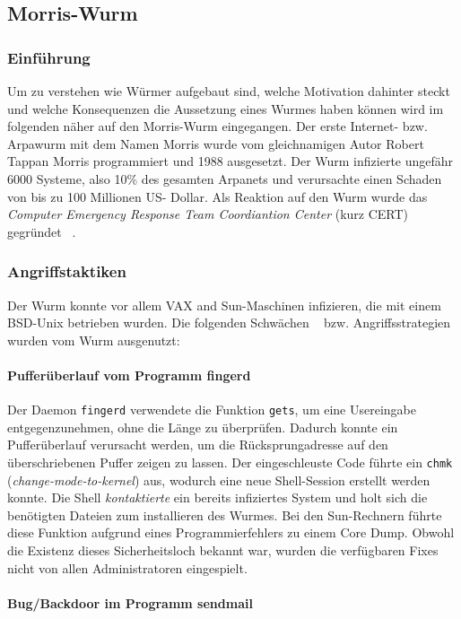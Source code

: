 \subsection {Morris-Wurm}
\subsubsection {Einführung} Um zu verstehen wie Würmer aufgebaut sind,
welche Motivation dahinter steckt und welche Konsequenzen die
Aussetzung eines Wurmes haben können wird im folgenden näher auf den
Morris-Wurm eingegangen.  Der erste Internet- bzw. Arpawurm mit dem
Namen Morris wurde vom gleichnamigen Autor Robert Tappan Morris
programmiert und 1988 ausgesetzt. Der Wurm infizierte ungefähr 6000
Systeme, also 10\% des gesamten Arpanets und verursachte einen Schaden
von bis zu 100 Millionen US- Dollar. Als Reaktion auf den Wurm wurde
das \textit{Computer Emergency Response Team Coordiantion Center}
(kurz CERT) gegründet ~\cite{wuermer-overview}.

\subsubsection {Angriffstaktiken}

Der Wurm konnte vor allem VAX and Sun-Maschinen infizieren, die mit
einem BSD-Unix betrieben wurden.  Die folgenden Schwächen
~\cite{wuermer-morris} bzw. Angriffsstrategien wurden vom Wurm
ausgenutzt:

\paragraph{Pufferüberlauf vom Programm fingerd}

Der Daemon \texttt{fingerd} verwendete die Funktion \texttt{gets}, um
eine Usereingabe entgegenzunehmen, ohne die Länge zu
überprüfen. Dadurch konnte ein Pufferüberlauf verursacht werden, um
die Rücksprungadresse auf den überschriebenen Puffer zeigen zu
lassen. Der eingeschleuste Code führte ein \texttt{chmk}
(\textit{change-mode-to-kernel}) aus, wodurch eine neue Shell-Session
erstellt werden konnte. Die Shell \textit{kontaktierte} ein bereits
infiziertes System und holt sich die benötigten Dateien zum
installieren des Wurmes. Bei den Sun-Rechnern führte diese Funktion
aufgrund eines Programmierfehlers zu einem Core Dump.  Obwohl die
Existenz dieses Sicherheitsloch bekannt war, wurden die verfügbaren
Fixes nicht von allen Administratoren eingespielt.

\paragraph{Bug/Backdoor im Programm sendmail}

